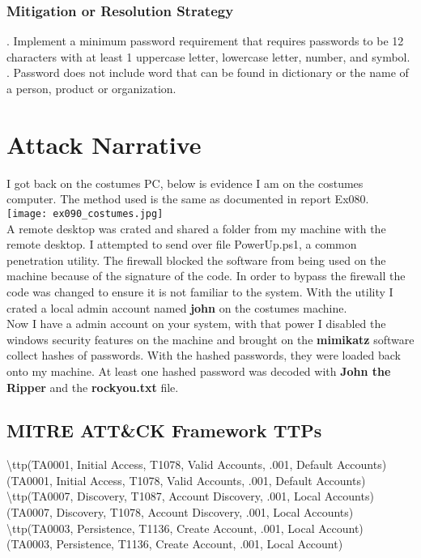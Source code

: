 \documentclass[notitlepage]{article}
\begin{document}
	\subsubsection{Mitigation or Resolution Strategy}
	\indent {}. Implement a minimum password requirement that requires passwords to be 12 characters with at least 1 uppercase letter, lowercase letter, number, and symbol.  \\
	. Password does not include word that can be found in dictionary or the name of a person, product or organization.  \\
	
	\section{Attack Narrative}
	
	\indent I got back on the costumes PC, below is evidence I am on the costumes computer. The method used is the same as documented in report Ex080. \\
	
	\texttt{[image: ex090\_costumes.jpg]} \\
	
	\indent A remote desktop was crated and shared a folder from my machine with the remote desktop.  I attempted to send over file PowerUp.ps1, a common penetration utility.  The firewall blocked the software from being used on the machine because of the signature of the code. In order to bypass the firewall the code was changed to ensure it is not familiar to the system.  With the utility I crated a local admin account named \textbf{john} on the costumes machine.  \\
	\indent Now I have a admin account on your system, with that power I disabled the windows security features on the machine and brought on the \textbf{mimikatz} software collect hashes of passwords.  With the hashed passwords, they were loaded back onto my machine.  At least one hashed password was decoded with  \textbf{John the Ripper} and the \textbf{rockyou.txt} file.  

	
	\subsection{MITRE ATT{\&}CK Framework TTPs}
	
	\indent\textbackslash ttp(TA0001, Initial Access, T1078, Valid Accounts, .001, Default Accounts) \\
	\ttp(TA0001, Initial Access, T1078, Valid Accounts, .001, Default Accounts) \\
	\indent\textbackslash ttp(TA0007, Discovery, T1087, Account Discovery, .001, Local Accounts) \\
	\ttp(TA0007, Discovery, T1078, Account Discovery, .001, Local Accounts) \\
	\indent\textbackslash ttp(TA0003, Persistence, T1136, Create Account, .001, Local Account) \\
	\ttp(TA0003, Persistence, T1136, Create Account, .001, Local Account) \\
	
\end{document}
